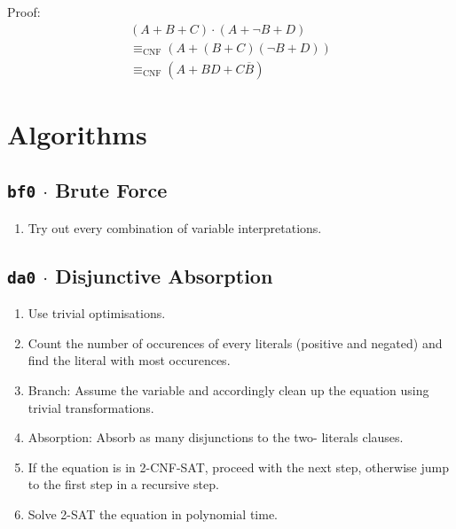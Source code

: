\documentclass[12pt, letterpaper]{article}
\begin{document}
\begin{description}
        Proof: \begin{equation}\nonumber\begin{split}
            (A + B + C) \cdot (A + \lnot B + D) \\
            \equiv_\text{CNF} (A + (B + C)(\lnot B + D)) \\
            \equiv_\text{CNF} (A + BD + C \overline B)
        \end{split}\end{equation}

    \end{description}

    \section{Algorithms}

    \subsection*{\texttt{bf0} $\cdot$ Brute Force}

    \begin{enumerate}
        \item Try out every combination of variable interpretations.
    \end{enumerate}

    \subsection*{\texttt{da0} $\cdot$ Disjunctive Absorption}

    \begin{enumerate}
        \item Use trivial optimisations.

        \item Count the number of occurences of every literals
        (positive and negated) and find the literal with most
        occurences.

        \item Branch: Assume the variable and accordingly clean
        up the equation using trivial transformations.

        \item Absorption: Absorb as many disjunctions to the two-
        literals clauses.

        \item If the equation is in 2-CNF-SAT, proceed with the
        next step, otherwise jump to the first step in a recursive
        step.

        \item Solve 2-SAT the equation in polynomial time.
    \end{enumerate}
\end{document}
